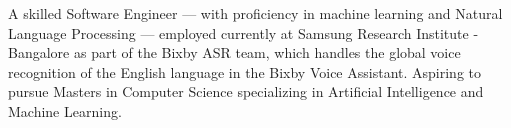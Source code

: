 

\begin{cvparagraph}

A skilled Software Engineer — with proficiency in machine learning and Natural Language Processing — employed
currently at Samsung Research Institute - Bangalore as part of the Bixby ASR team, which handles the global voice
recognition of the English language in the Bixby Voice Assistant.
Aspiring to pursue Masters in Computer Science specializing in Artificial Intelligence and Machine Learning.
\end{cvparagraph}
